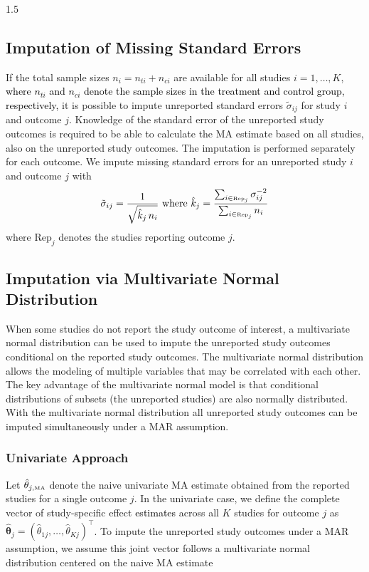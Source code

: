 \documentclass{article}
\newcommand{\mycolor}[1]{\textcolor{black}{#1}}
\begin{document}
\begin{spacing}{1.5}
\subsection{Imputation of Missing Standard Errors} \label{ImputationSE}

If the total sample sizes $n_i = n_{ti} + n_{ci}$ are available for all studies $i = 1,\dots,K$, \mycolor{where $n_{ti}$ and $n_{ci}$ denote the sample sizes in the treatment and control group, respectively,} it is possible to impute unreported standard errors $\tilde\sigma_{ij}$ for study $i$ and outcome $j$. Knowledge of the standard error of the unreported study outcomes is required to be able to calculate the MA estimate based on all studies, also on the unreported study outcomes. The imputation is performed separately for each outcome. We impute missing standard errors for an unreported study $i$ and outcome $j$ with \cite{copas2014model}
\begin{equation} \label{eq:missingVar}
\tilde\sigma_{ij} = \frac{1}{\sqrt{\hat k_j \, n_i}} \mbox{ where } \hat k_j  = \frac{\sum_{i \in \mbox{\tiny{Rep}}_j} \sigma_{ij} ^{-2}}{\sum_{i \in \mbox{\tiny{Rep}}_j} n_i}
\end{equation}
where $\text{Rep}_j$ denotes the studies reporting outcome $j$.

\subsection{Imputation via Multivariate Normal Distribution}
\label{ImputationMVN}

When some studies do not report the study outcome of interest, a multivariate normal distribution can be used to impute the unreported study outcomes conditional on the reported study outcomes. The multivariate normal distribution allows the modeling of multiple variables that may be correlated with each other. The key advantage of the multivariate normal model is that conditional distributions of subsets (\eg the unreported studies) are also normally distributed. With the multivariate normal distribution all unreported study outcomes can be imputed simultaneously under a MAR assumption. 

\subsubsection{Univariate Approach} 
\label{univariateMVN}

Let $\hat{\theta}_{j,\tiny{\mbox{MA}}}$ denote the naive univariate MA estimate obtained from the reported studies for a single outcome $j$. In the univariate case, we define the complete vector of study-specific effect \mycolor{estimates} across all $K$ studies for outcome $j$ as $\widehat{\boldsymbol{\theta}}_j = (\hat{\theta}_{1j}, \dots, \hat{\theta}_{Kj})^\top$. To impute the unreported study outcomes under a MAR assumption, we assume this joint vector follows a multivariate normal distribution centered on the naive MA estimate


\end{spacing}
\end{document}
